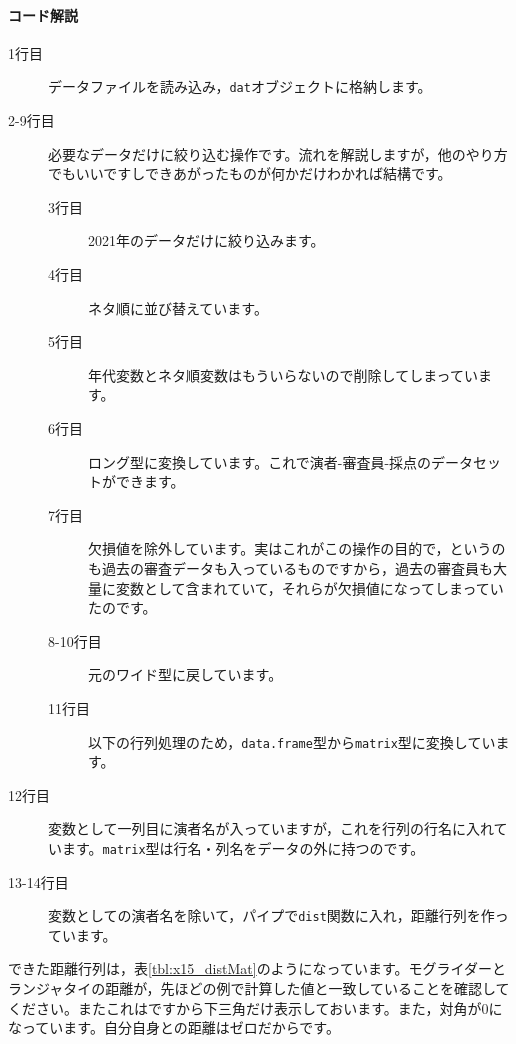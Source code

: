 \documentclass{ltjsbook}
\begin{document}
\paragraph{コード解説}
\begin{description}
	\item[1行目] データファイルを読み込み，\verb|dat|オブジェクトに格納します。
	\item[2-9行目] 必要なデータだけに絞り込む操作です。流れを解説しますが，他のやり方でもいいですしできあがったものが何かだけわかれば結構です。
	      \begin{description}
		      \item[3行目] 2021年のデータだけに絞り込みます。
		      \item[4行目] ネタ順に並び替えています。
		      \item[5行目] 年代変数とネタ順変数はもういらないので削除してしまっています。
		      \item[6行目] ロング型に変換しています。これで演者-審査員-採点のデータセットができます。
		      \item[7行目] 欠損値を除外しています。実はこれがこの操作の目的で，というのも過去の審査データも入っているものですから，過去の審査員も大量に変数として含まれていて，それらが欠損値になってしまっていたのです。
		      \item[8-10行目] 元のワイド型に戻しています。
		      \item[11行目] 以下の行列処理のため，\verb|data.frame|型から\verb|matrix|型に変換しています。
	      \end{description}
	\item[12行目] 変数として一列目に演者名が入っていますが，これを行列の行名に入れています。\verb|matrix|型は行名・列名をデータの外に持つのです。
	\item[13-14行目] 変数としての演者名を除いて，パイプで\verb|dist|関数に入れ，距離行列を作っています。
\end{description}
できた距離行列は，表\ref{tbl:x15_distMat}のようになっています。モグライダーとランジャタイの距離が，先ほどの例で計算した値と一致していることを確認してください。またこれはですから下三角だけ表示しておいます。また，対角が$0$になっています。自分自身との距離はゼロだからです。
\end{document}
